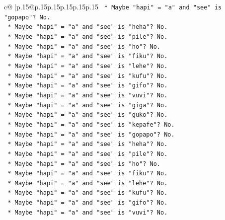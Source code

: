 \documentclass{article}
\begin{document}
{\begin{supertabular}{c@{$\;$}|p{.15\linewidth}@{}p{.15\linewidth}p{.15\linewidth}p{.15\linewidth}p{.15\linewidth}p{.15\linewidth}}
{{{\texttt{                        *   Maybe "hapi" = "a" and "see" is "gopapo"? No.} \\
\texttt{                        *   Maybe "hapi" = "a" and "see" is "heha"? No.} \\
\texttt{                        *   Maybe "hapi" = "a" and "see" is "pile"? No.} \\
\texttt{                        *   Maybe "hapi" = "a" and "see" is "ho"? No.} \\
\texttt{                        *   Maybe "hapi" = "a" and "see" is "fiku"? No.} \\
\texttt{                        *   Maybe "hapi" = "a" and "see" is "lehe"? No.} \\
\texttt{                        *   Maybe "hapi" = "a" and "see" is "kufu"? No.} \\
\texttt{                        *   Maybe "hapi" = "a" and "see" is "gifo"? No.} \\
\texttt{                        *   Maybe "hapi" = "a" and "see" is "vuvi"? No.} \\
\texttt{                        *   Maybe "hapi" = "a" and "see" is "giga"? No.} \\
\texttt{                        *   Maybe "hapi" = "a" and "see" is "guko"? No.} \\
\texttt{                        *   Maybe "hapi" = "a" and "see" is "kepafe"? No.} \\
\texttt{                        *   Maybe "hapi" = "a" and "see" is "gopapo"? No.} \\
\texttt{                        *   Maybe "hapi" = "a" and "see" is "heha"? No.} \\
\texttt{                        *   Maybe "hapi" = "a" and "see" is "pile"? No.} \\
\texttt{                        *   Maybe "hapi" = "a" and "see" is "ho"? No.} \\
\texttt{                        *   Maybe "hapi" = "a" and "see" is "fiku"? No.} \\
\texttt{                        *   Maybe "hapi" = "a" and "see" is "lehe"? No.} \\
\texttt{                        *   Maybe "hapi" = "a" and "see" is "kufu"? No.} \\
\texttt{                        *   Maybe "hapi" = "a" and "see" is "gifo"? No.} \\
\texttt{                        *   Maybe "hapi" = "a" and "see" is "vuvi"? No.} \\
}}}
\end{supertabular}}
\end{document}
